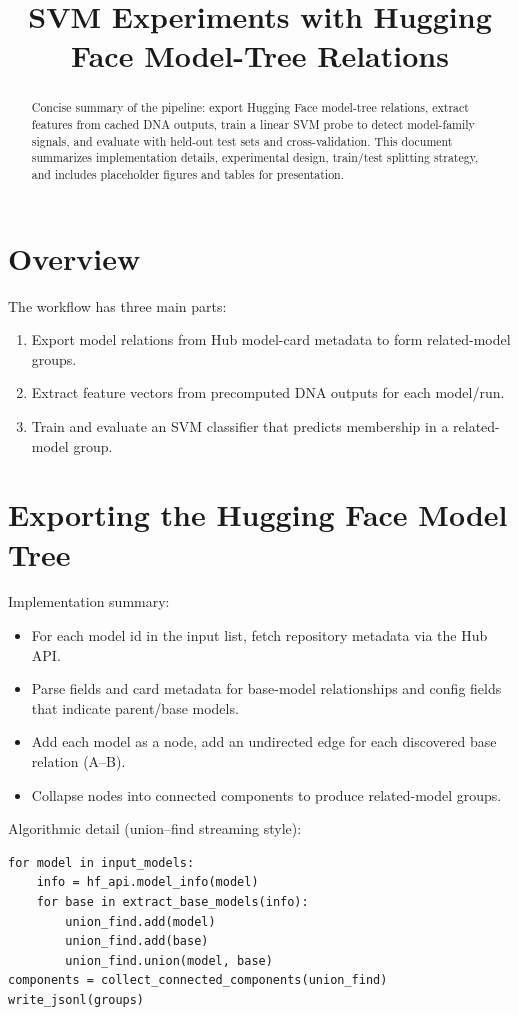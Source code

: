 \documentclass[11pt,a4paper]{article}
\title{SVM Experiments with Hugging Face Model-Tree Relations}
\author{}
\date{}
\begin{document}
\maketitle

\begin{abstract}
Concise summary of the pipeline: export Hugging Face model-tree relations, extract features from cached DNA outputs, train a linear SVM probe to detect model-family signals, and evaluate with held-out test sets and cross-validation. This document summarizes implementation details, experimental design, train/test splitting strategy, and includes placeholder figures and tables for presentation.
\end{abstract}

\section{Overview}
The workflow has three main parts:
\begin{enumerate}
  \item Export model relations from Hub model-card metadata to form related-model groups.
  \item Extract feature vectors from precomputed DNA outputs for each model/run.
  \item Train and evaluate an SVM classifier that predicts membership in a related-model group.
\end{enumerate}

\section{Exporting the Hugging Face Model Tree}
Implementation summary:
\begin{itemize}
  \item For each model id in the input list, fetch repository metadata via the Hub API.
  \item Parse fields and card metadata for base-model relationships and config fields that indicate parent/base models.
  \item Add each model as a node, add an undirected edge for each discovered base relation (A--B).
  \item Collapse nodes into connected components to produce related-model groups.
\end{itemize}

Algorithmic detail (union--find streaming style):
\begin{lstlisting}[basicstyle=\ttfamily\small]
for model in input_models:
    info = hf_api.model_info(model)
    for base in extract_base_models(info):
        union_find.add(model)
        union_find.add(base)
        union_find.union(model, base)
components = collect_connected_components(union_find)
write_jsonl(groups)
\end{lstlisting}
\end{document}
